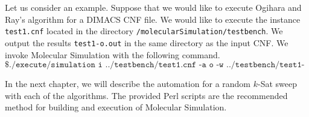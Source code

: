 \FloatBarrier

Let us consider an example.  Suppose that we would like to execute Ogihara and Ray's algorithm for a DIMACS CNF file.  We would like to execute the instance \texttt{test1.cnf} located in the directory \texttt{/molecularSimulation/testbench}.  We output the results \texttt{test1-o.out} in the same directory as the input CNF.  We invoke Molecular Simulation with the following command.
\[
\texttt{\$ ./execute/simulation i ../testbench/test1.cnf -a o -w ../testbench/test1-o.out}
\]
		
In the next chapter, we will describe the automation for a random $k$-{\sc Sat} sweep with each of the algorithms.  The provided Perl scripts are the recommended method for building and execution of Molecular Simulation.
